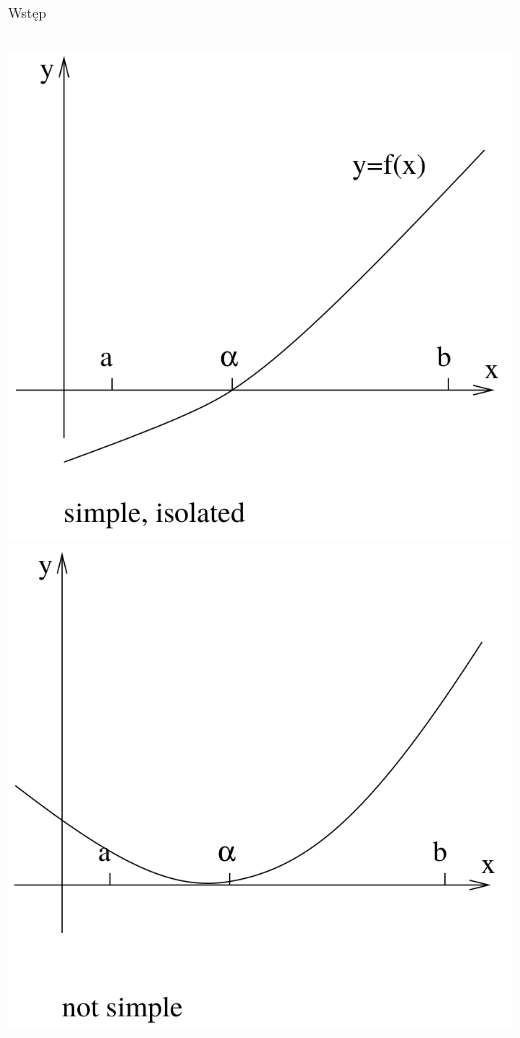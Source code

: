 \begin{frame}{Wstęp}
	\begin{columns}
		\centering   \includegraphics[width=1\linewidth]{img/7/7_1_1}
		\centering   \includegraphics[width=1\linewidth]{img/7/7_1_2}
	\end{columns}
\end{frame}
